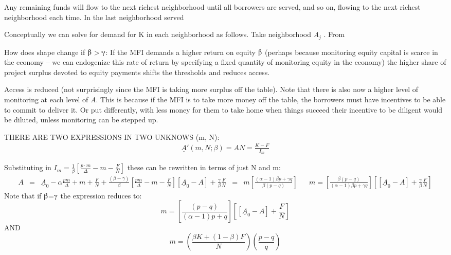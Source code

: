 \documentclass{article} %
\begin{document}
\noindent 

\noindent 

\noindent Any remaining funds will flow to the next richest neighborhood until all borrowers are served, and so on, flowing to the next richest neighborhood each time. In the last neighborhood served 

\noindent Conceptually we can solve for demand for K in each neighborhood as follows.  Take neighborhood \textit{A${}_{j}$} .  From 

\noindent 

\noindent 

\noindent How does shape change if $\mathrm{\betaup }$$\mathrm{>}$$\mathrm{\gammaup }$:  If the MFI demands a higher return on equity $\mathrm{\betaup }$ (perhaps because monitoring equity capital is scarce in the economy -- we can endogenize this rate of return by specifying a fixed quantity of monitoring equity in the economy) the higher share of project surplus devoted to equity payments shifts the thresholds and reduces access.  

\noindent 

\noindent 

\noindent Access is reduced (not surprisingly since the MFI is taking more surplus off the table).  Note that there is also now a higher level of monitoring at each level of \textit{A}.  This is because if the MFI is to take more money off the table, the borrowers must have incentives to be able to commit to deliver it. Or put differently, with less money for them to take home when things succeed their incentive to be diligent would be diluted, unless monitoring can be stepped up. 

\noindent 

\noindent THERE ARE TWO EXPRESSIONS IN TWO UNKNOWS (m, N):
\[\begin{array}{l} {\underline{A}'(m,N;\beta )=A}  {N=\frac{K-F}{I_{m} } } \end{array}\] 


\noindent Substituting in $I_{m} =\frac{1}{\beta } \left[\frac{p\cdot m}{\Delta } -m-\frac{F}{N} \right]$ these can be rewritten in terms of just N and m:
\[\begin{array}{rcl} {A} & {=} & {\underline{A}_{0} -\alpha \frac{pm}{\Delta } +m+\frac{F}{N} +\frac{(\beta -\gamma )}{\beta } \left[\frac{pm}{\Delta } -m-\frac{F}{N} \right]}  {\left[\underline{A}_{0} -A\right]+\frac{\gamma }{\beta } \frac{F}{N} } & {=} & {m\left[\frac{(\alpha -1)\beta p+\gamma q}{\beta (p-q)} \right]}  {} & {} & {\boxed{m=\left[\frac{\beta (p-q)}{(\alpha -1)\beta p+\gamma q} \right]\left[\left[\underline{A}_{0} -A\right]+\frac{\gamma }{\beta } \frac{F}{N} \right]} } \end{array}\] 
Note that if $\mathrm{\betaup }$=$\mathrm{\gammaup }$ the expression reduces to:
\[m=\left[\frac{(p-q)}{(\alpha -1)p+q} \right]\left[\left[\underline{A}_{0} -A\right]+\frac{F}{N} \right]\] 
AND 
\begin{equation} \label{1.15)} 
\boxed{m=\left(\frac{\beta K+(1-\beta )F}{N} \right)\left(\frac{p-q}{q} \right)}  
\end{equation} 
\end{document}
